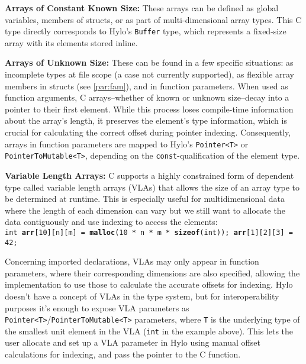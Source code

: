 \textbf{Arrays of Constant Known Size:} These arrays can be defined as global variables, members of structs, or as part of multi-dimensional array types. This C type directly corresponds to Hylo's \texttt{Buffer} type, which represents a fixed-size array with its elements stored inline.

\textbf{Arrays of Unknown Size:} These can be found in a few specific situations: as incomplete types at file scope (a case not currently supported), as flexible array members in structs (see \autoref{par:fam}), and in function parameters. When used as function arguments, C arrays--whether of known or unknown size--decay into a pointer to their first element. While this process loses compile-time information about the array's length, it preserves the element's type information, which is crucial for calculating the correct offset during pointer indexing. Consequently, arrays in function parameters are mapped to Hylo's \texttt{Pointer<T>} or \texttt{PointerToMutable<T>}, depending on the \texttt{const}-qualification of the element type.

\textbf{Variable Length Arrays:}
C supports a highly constrained form of dependent type called variable length arrays (VLAs) that allows the size of an array type to be determined at runtime. This is especially useful for multidimensional data\cite{vla-reddit} where the length of each dimension can vary but we still want to allocate the data contiguously and use indexing to access the elements: \\
\texttt{int \textbf{arr}[10][n][m] = \textbf{malloc}(10 * n * m * \textbf{sizeof}(int)); \space\space\space   \textbf{arr}[1][2][3] = 42;}

Concerning imported declarations, VLAs may only appear in function parameters, where their corresponding dimensions are also specified, allowing the implementation to use those to calculate the accurate offsets for indexing. Hylo doesn't have a concept of VLAs in the type system, but for interoperability purposes it's enough to expose VLA parameters as \texttt{Pointer<T>}/\texttt{PointerToMutable<T>} parameters, where \texttt{T} is the underlying type of the smallest unit element in the VLA (\texttt{int} in the example above). This lets the user allocate and set up a VLA parameter in Hylo using manual offset calculations for indexing, and pass the pointer to the C function.
